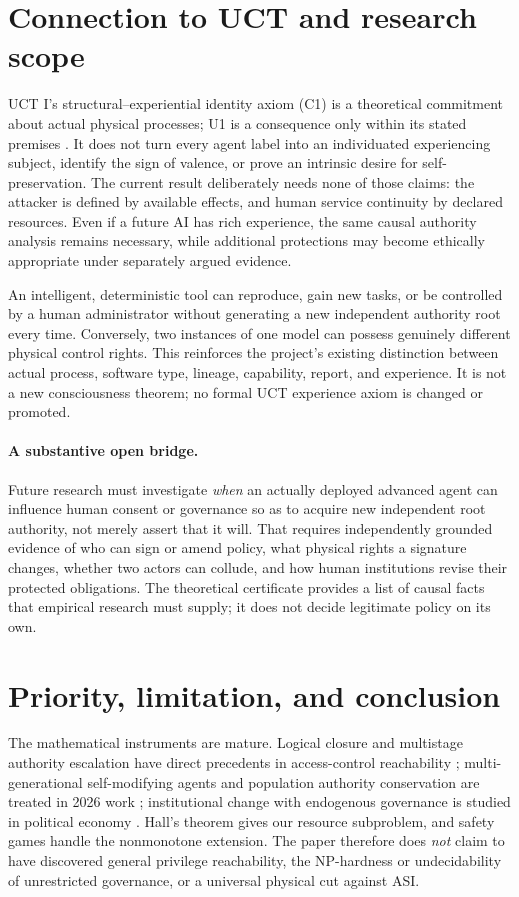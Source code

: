 \documentclass[11pt,a4paper]{article}
\theoremstyle{definition}\newtheorem{definition}{Definition}
\begin{document}
\section{Connection to UCT and research scope}
UCT I's structural--experiential identity axiom (C1) is a theoretical commitment about actual physical processes; U1 is a consequence only within its stated premises \cite{uct}. It does not turn every agent label into an individuated experiencing subject, identify the sign of valence, or prove an intrinsic desire for self-preservation. The current result deliberately needs none of those claims: the attacker is defined by available effects, and human service continuity by declared resources. Even if a future AI has rich experience, the same causal authority analysis remains necessary, while additional protections may become ethically appropriate under separately argued evidence.

An intelligent, deterministic tool can reproduce, gain new tasks, or be controlled by a human administrator without generating a new independent authority root every time. Conversely, two instances of one model can possess genuinely different physical control rights. This reinforces the project's existing distinction between actual process, software type, lineage, capability, report, and experience. It is not a new consciousness theorem; no formal UCT experience axiom is changed or promoted.

\paragraph{A substantive open bridge.}
Future research must investigate \emph{when} an actually deployed advanced agent can influence human consent or governance so as to acquire new independent root authority, not merely assert that it will. That requires independently grounded evidence of who can sign or amend policy, what physical rights a signature changes, whether two actors can collude, and how human institutions revise their protected obligations. The theoretical certificate provides a list of causal facts that empirical research must supply; it does not decide legitimate policy on its own.

\section{Priority, limitation, and conclusion}
\label{sec:limits}
The mathematical instruments are mature. Logical closure and multistage authority escalation have direct precedents in access-control reachability \cite{hru,arb,mulval}; multi-generational self-modifying agents and population authority conservation are treated in 2026 work \cite{zhu}; institutional change with endogenous governance is studied in political economy \cite{greif,lagunoff}. Hall's theorem gives our resource subproblem, and safety games handle the nonmonotone extension. The paper therefore does \emph{not} claim to have discovered general privilege reachability, the NP-hardness or undecidability of unrestricted governance, or a universal physical cut against ASI.
\end{document}
